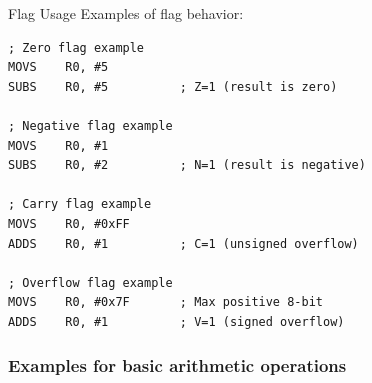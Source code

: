\begin{example2}{Flag Usage}
Examples of flag behavior:
\begin{lstlisting}[language=armasm, style=basesmol]
; Zero flag example
MOVS    R0, #5
SUBS    R0, #5          ; Z=1 (result is zero)

; Negative flag example
MOVS    R0, #1
SUBS    R0, #2          ; N=1 (result is negative)

; Carry flag example
MOVS    R0, #0xFF
ADDS    R0, #1          ; C=1 (unsigned overflow)

; Overflow flag example
MOVS    R0, #0x7F       ; Max positive 8-bit
ADDS    R0, #1          ; V=1 (signed overflow)
\end{lstlisting}
\end{example2}

\columnbreak

\subsubsection{Examples for basic arithmetic operations}

